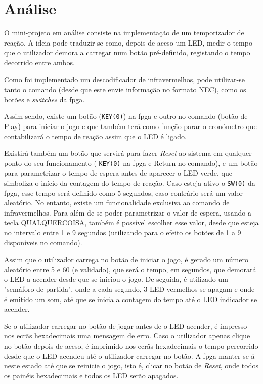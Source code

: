 \documentclass[a4paper,11pt,onecolumn]{report}
\begin{document}
\chapter{Análise}
\label{chap.analise}
O mini-projeto em análise consiste na implementação de um temporizador de reação. A ideia pode traduzir-se como, depois de aceso um LED, medir o tempo que o utilizador demora a carregar num botão pré-definido, registando o tempo decorrido entre ambos. 

Como foi implementado um descodificador de infravermelhos, pode utilizar-se tanto o comando (desde que este envie informação no formato NEC), como os botões e \textit{switches} da \ac{fpga}. 

Assim sendo, existe um botão (\texttt{KEY(0)}) na \ac{fpga} e outro no comando (botão de Play) para iniciar o jogo e que também terá como função parar o cronómetro que contabilizará o tempo de reação assim que o LED é ligado.

Existirá também um botão que servirá para fazer \textit{Reset} ao sistema em qualquer ponto do seu funcionamento ( \texttt{KEY(0)} na \ac{fpga} e Return no comando), e um botão para parametrizar o tempo de espera antes de aparecer o LED verde, que simboliza o início da contagem do tempo de reação. Caso esteja ativo o \texttt{SW(0)} da \ac{fpga}, esse tempo será definido como 5 segundos, caso contrário será um valor aleatório. No entanto, existe um funcionalidade exclusiva ao comando de infravermelhos. Para além de se poder parametrizar o valor de espera, usando a tecla QUALQUERCOISA, também é possível escolher esse valor, desde que esteja no intervalo entre 1 e 9 segundos (utilizando para o efeito os botões de 1 a 9 disponíveis no comando).

Assim que o utilizador carrega no botão de iniciar o jogo, é gerado um número aleatório entre 5 e 60 (e validado), que será o tempo, em segundos, que demorará o LED a acender desde que se iniciou o jogo. De seguida, é utilizado um "semáforo de partida", onde a cada segundo, 3 LED vermelhos se apagam e onde é emitido um som, até que se inicia a contagem do tempo até o LED indicador se acender.

Se o utilizador carregar no botão de jogar antes de o LED acender, é impresso nos ecrãs hexadecimais uma mensagem de erro. Caso o utilizador apenas clique no botão depois de aceso, é imprimido nos ecrãs hexadecimais o tempo percorrido desde que o LED acendeu até o utilizador carregar no botão. A \ac{fpga} manter-se-á neste estado até que se reinicie o jogo, isto é, clicar no botão de \textit{Reset}, onde todos os painéis hexadecimais e todos os LED serão apagados.
\end{document}
